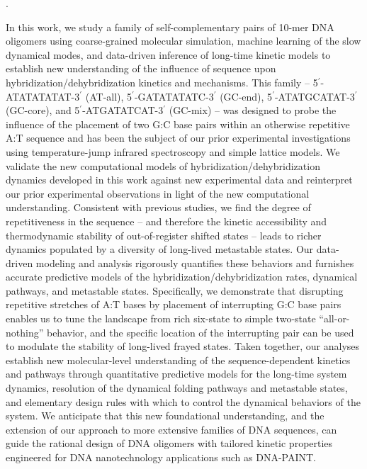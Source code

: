 \documentclass[journal=jpcbfk,manuscript=article]{achemso}
\begin{document}
\citep{Snodin2019Coarse-grainedOrigami, Doye2020TheOrigami}.

In this work, we study a family of self-complementary pairs of 10-mer DNA oligomers using coarse-grained molecular simulation, machine learning of the slow dynamical modes, and data-driven inference of long-time kinetic models to establish new understanding of the influence of sequence upon hybridization/dehybridization kinetics and mechanisms. This family -- 5$^\prime$-ATATATATAT-3$^\prime$ (AT-all), 5$^\prime$-GATATATATC-3$^\prime$ (GC-end), 5$^\prime$-ATATGCATAT-3$^\prime$ (GC-core), and 5$^\prime$-ATGATATCAT-3$^\prime$ (GC-mix) -- was designed to probe the influence of the placement of two G:C base pairs within an otherwise repetitive A:T sequence and has been the subject of our prior experimental investigations using temperature-jump infrared spectroscopy and simple lattice models. \citep{Sanstead2016} We validate the new computational models of hybridization/dehybridization dynamics developed in this work against new experimental data and reinterpret our prior experimental observations in light of the new computational understanding. Consistent with previous studies, \citep{Hinckley2014Coarse-grainedEffects,Romano2013DNADependence,Araque2016LatticeCooperativity} we find the degree of repetitiveness in the sequence -- and therefore the kinetic accessibility and thermodynamic stability of out-of-register shifted states -- leads to richer dynamics populated by a diversity of long-lived metastable states. Our data-driven modeling and analysis rigorously quantifies these behaviors and furnishes accurate predictive models of the hybridization/dehybridization rates, dynamical pathways, and metastable states. Specifically, we demonstrate that disrupting repetitive stretches of A:T bases by placement of interrupting G:C base pairs enables us to tune the landscape from rich six-state to simple two-state ``all-or-nothing'' behavior, and the specific location of the interrupting pair can be used to modulate the stability of long-lived frayed states. Taken together, our analyses establish new molecular-level understanding of the sequence-dependent kinetics and pathways through quantitative predictive models for the long-time system dynamics, resolution of the dynamical folding pathways and metastable states, and elementary design rules with which to control the dynamical behaviors of the system. We anticipate that this new foundational understanding, and the extension of our approach to more extensive families of DNA sequences, can guide the rational design of DNA oligomers with tailored kinetic properties engineered for DNA nanotechnology applications such as DNA-PAINT. \citep{Shah2019, Strauss2020UpDNA-PAINT}
\end{document}
